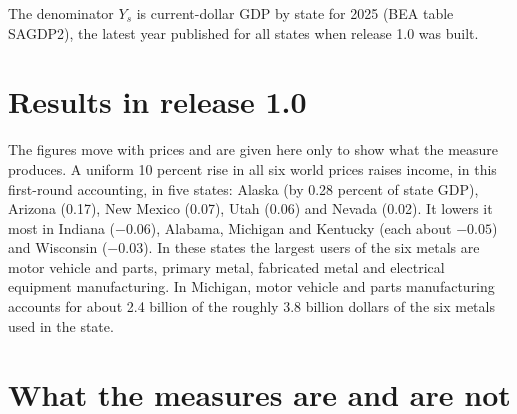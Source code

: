 \documentclass[11pt]{article}
\begin{document}
The denominator $Y_s$ is current-dollar GDP by state for 2025 (BEA table SAGDP2), the latest
year published for all states when release 1.0 was built.

\section{Results in release 1.0}

The figures move with prices and are given here only to show what the measure produces. A
uniform 10 percent rise in all six world prices raises income, in this first-round
accounting, in five states: Alaska (by 0.28 percent of state GDP), Arizona (0.17), New
Mexico (0.07), Utah (0.06) and Nevada (0.02). It lowers it most in Indiana ($-0.06$),
Alabama, Michigan and Kentucky (each about $-0.05$) and Wisconsin ($-0.03$). In these
states the largest users of the six metals are motor vehicle and parts, primary metal,
fabricated metal and electrical equipment manufacturing. In Michigan, motor vehicle and parts manufacturing accounts for about 2.4
billion of the roughly 3.8 billion dollars of the six metals used in the state.

\section{What the measures are and are not}
\end{document}
